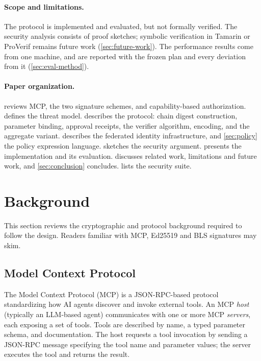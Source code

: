 \documentclass[11pt,a4paper]{article}
\begin{document}
\paragraph{Scope and limitations.}
The protocol is implemented and evaluated, but not formally verified. The
security analysis consists of proof sketches; symbolic verification in
Tamarin or ProVerif remains future work (\cref{sec:future-work}). The
performance results come from one machine, and are reported with the
frozen plan and every deviation from it (\cref{sec:eval-method}).

\paragraph{Paper organization.}
 reviews MCP, the two signature schemes, and
capability-based authorization.  defines the threat
model.  describes the protocol: chain digest
construction, parameter binding, approval receipts, the verifier algorithm,
encoding, and the aggregate variant.  describes the
federated identity infrastructure, and \cref{sec:policy} the policy
expression language.  sketches the security argument.
 presents the implementation and its evaluation.
 discusses related work, limitations and future work,
and \cref{sec:conclusion} concludes.  lists the
security suite.

\section{Background}
\label{sec:background}

This section reviews the cryptographic and protocol background required to
follow the design. Readers familiar with MCP, Ed25519 and BLS signatures
may skim.

\subsection{Model Context Protocol}
\label{sec:bg-mcp}

The Model Context Protocol (MCP) \citep{anthropic-mcp} is a JSON-RPC-based
protocol standardizing how AI agents discover and invoke external tools.
An MCP \emph{host} (typically an LLM-based agent) communicates with one or
more MCP \emph{servers}, each exposing a set of tools. Tools are described
by name, a typed parameter schema, and documentation. The host requests a
tool invocation by sending a JSON-RPC message specifying the tool name and
parameter values; the server executes the tool and returns the result.
\end{document}

